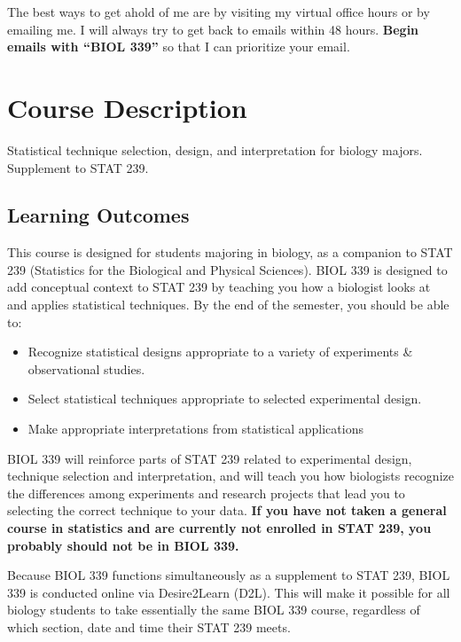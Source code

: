 \documentclass{tufte-handout}
\begin{document}
\begin{fullwidth}

 The best ways to get ahold of me are by visiting my virtual office hours or by emailing me. I will always try to get back to emails within 48 hours. \textbf{Begin emails with ``BIOL 339''} so that I can prioritize your email. 

\section{Course Description}

Statistical technique selection, design, and interpretation for biology majors. Supplement to STAT 239. 

\subsection{Learning Outcomes}

This course is designed for students majoring in biology, as a companion to STAT 239 (Statistics for the Biological and Physical Sciences). BIOL 339 is designed to add conceptual context to STAT 239 by teaching you how a biologist looks at and applies statistical techniques. By the end of the semester, you should be able to: 

\begin{itemize}
\item Recognize  statistical designs appropriate to a variety of experiments \& observational studies.
\item Select statistical techniques appropriate to selected experimental design.
\item Make appropriate interpretations from statistical applications 
\end{itemize}

BIOL 339 will reinforce parts of STAT 239 related to experimental design, technique selection and interpretation, and will teach you how biologists recognize the differences among experiments and research projects that lead you to selecting the correct technique to your data. \textbf{If you have not taken a general course in statistics and are currently not enrolled in STAT 239, you probably should not be in BIOL 339.}

Because BIOL 339 functions simultaneously as a supplement to STAT 239, BIOL 339 is conducted online via Desire2Learn (D2L). This will make it possible for all biology students to take essentially the same BIOL 339 course, regardless of which section, date and time their STAT 239 meets. 




\end{fullwidth}
\end{document}
